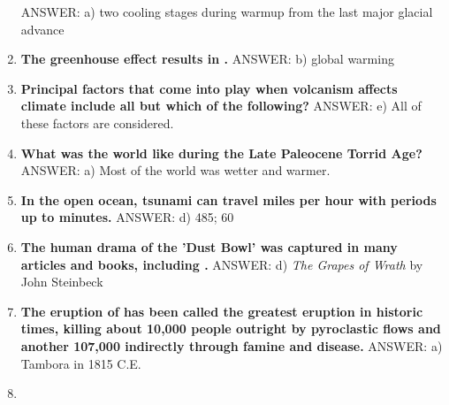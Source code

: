 \documentclass[10pt]{article}
\newcommand{\Rivpt}{\rule{.1pt}{1pt}}
\begin{document}
\begin{enumerate}
{\begin{samepage}
{}
ANSWER: a) two cooling stages during warmup from the last major glacial advance
\end{samepage}
}
\item {
\setlength{\itemsep}{0cm}
\setlength{\parskip}{.2cm}
\begin{samepage}
\textbf{
The greenhouse effect results in \makebox[1cm]{\Rivpt\hrulefill\Rivpt}.
}
ANSWER: b) global warming
\end{samepage}
}
\item {
\setlength{\itemsep}{0cm}
\setlength{\parskip}{.2cm}
\begin{samepage}
\textbf{
Principal factors that come into play when volcanism affects climate include all but which of the following?
}
ANSWER: e) All of these factors are considered.
\end{samepage}
}
\item {
\setlength{\itemsep}{0cm}
\setlength{\parskip}{.2cm}
\begin{samepage}
\textbf{
What was the world like during the Late Paleocene Torrid Age? 
}
ANSWER: a) Most of the world was wetter and warmer.
\end{samepage}
}
\item {
\setlength{\itemsep}{0cm}
\setlength{\parskip}{.2cm}
\begin{samepage}
\textbf{
In the open ocean, tsunami can travel \makebox[1cm]{\Rivpt\hrulefill\Rivpt} miles per hour with periods up to \makebox[1cm]{\Rivpt\hrulefill\Rivpt} minutes.
}
ANSWER: d)	485; 60
\end{samepage}
}
\item {
\setlength{\itemsep}{0cm}
\setlength{\parskip}{.2cm}
\begin{samepage}
\textbf{
The human drama of the 'Dust Bowl' was captured in many articles and books, including \makebox[1cm]{\Rivpt\hrulefill\Rivpt}.
}
ANSWER: d) \emph{The Grapes of Wrath} by John Steinbeck 
\end{samepage}
}
\item {
\setlength{\itemsep}{0cm}
\setlength{\parskip}{.2cm}
\begin{samepage}
\textbf{
The eruption of \makebox[1cm]{\Rivpt\hrulefill\Rivpt} has been called the greatest eruption in historic times, killing about 10,000 people outright by pyroclastic flows and another 107,000 indirectly through famine and disease. 
}
ANSWER: a) Tambora in 1815 C.E.
\end{samepage}
}
\item {
\setlength{\itemsep}{0cm}
\setlength{\parskip}{.2cm}
\begin{samepage}

\end{samepage}}
\end{enumerate}
\end{document}
